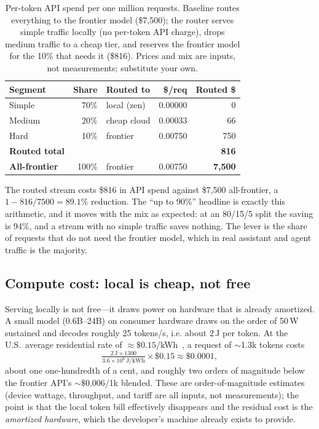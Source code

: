 \documentclass[11pt]{article}
\begin{document}
\begin{table}[t]
\centering
\footnotesize
\setlength{\tabcolsep}{4pt}
\begin{tabular}{@{}lrlrr@{}}
\toprule
Segment & Share & Routed to & \$/req & Routed \$ \\
\midrule
Simple  & 70\% & local (zen)   & 0.00000 & 0 \\
Medium  & 20\% & cheap cloud   & 0.00033 & 66 \\
Hard    & 10\% & frontier      & 0.00750 & 750 \\
\midrule
\textbf{Routed total}  & & & & \textbf{816} \\
\textbf{All-frontier}  & 100\% & frontier & 0.00750 & \textbf{7{,}500} \\
\bottomrule
\end{tabular}
\caption{Per-token API spend per one million requests. Baseline routes
everything to the frontier model (\$7{,}500); the router serves simple traffic
locally (no per-token API charge), drops medium traffic to a cheap tier, and
reserves the frontier model for the 10\% that needs it (\$816). Prices and mix
are inputs, not measurements; substitute your own.}
\label{tab:cost}
\end{table}

The routed stream costs \$816 in API spend against \$7{,}500 all-frontier, a
$1 - 816/7500 = 89.1\%$ reduction. The ``up to 90\%'' headline is exactly this
arithmetic, and it moves with the mix as expected: at an 80/15/5 split the saving
is 94\%, and a stream with no simple traffic saves nothing. The lever is the
share of requests that do not need the frontier model, which in real assistant
and agent traffic is the majority.

\subsection{Compute cost: local is cheap, not free}
\label{sec:compute}

Serving locally is not free---it draws power on hardware that is already
amortized. A small model (0.6B--24B) on consumer hardware draws on the order of
50\,W sustained and decodes roughly 25 tokens/s, i.e. about 2\,J per token. At
the U.S.\ average residential rate of $\approx\$0.15$/kWh~\cite{eia}, a request
of $\sim$1.3k tokens costs
\begin{equation*}
\tfrac{2\,\text{J}\times 1300}{3.6\times10^6\,\text{J/kWh}}\times \$0.15 \approx \$0.0001,
\end{equation*}
about one one-hundredth of a cent, and roughly two orders of magnitude below the
frontier API's $\sim\$0.006$/1k blended. These are order-of-magnitude estimates
(device wattage, throughput, and tariff are all inputs, not measurements); the
point is that the local token bill effectively disappears and the residual cost
is the \emph{amortized hardware}, which the developer's machine already exists to
provide.
\end{document}

